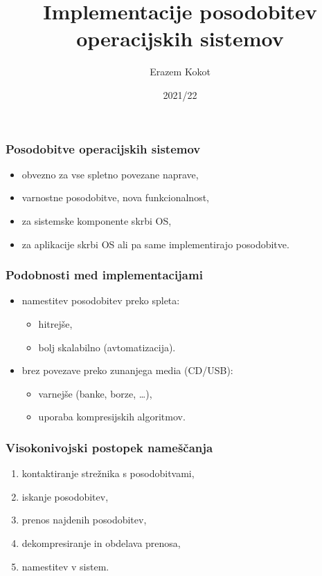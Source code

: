 \documentclass[aspectratio=169]{beamer}
\title{Implementacije posodobitev operacijskih sistemov}
\author{Erazem Kokot}
\institute[FRI]{Sistemska programska oprema,\\Fakulteta za računalništvo in informatiko}
\date{2021/22}
\begin{document}
    \begin{frame}
    \titlepage
    \end{frame}

    \begin{frame}
        \frametitle{Posodobitve operacijskih sistemov}
        \begin{itemize}
            \item obvezno za vse spletno povezane naprave,
            \item varnostne posodobitve, nova funkcionalnost,
            \item za sistemske komponente skrbi OS,
            \item za aplikacije skrbi OS ali pa same implementirajo posodobitve.
        \end{itemize}
    \end{frame}

    \begin{frame}
        \frametitle{Podobnosti med implementacijami}
        \begin{itemize}
            \item namestitev posodobitev preko spleta:
            \begin{itemize}
                \item hitrejše,
                \item bolj skalabilno (avtomatizacija).
            \end{itemize}
            \item brez povezave preko zunanjega media (CD/USB):
            \begin{itemize}
                \item varnejše (banke, borze, \ldots),
                \item uporaba kompresijskih algoritmov.
            \end{itemize}
        \end{itemize}
    \end{frame}

    \begin{frame}
        \frametitle{Visokonivojski postopek nameščanja}
        \begin{enumerate}
            \item kontaktiranje strežnika s posodobitvami,
            \item iskanje posodobitev,
            \item prenos najdenih posodobitev,
            \item dekompresiranje in obdelava prenosa,
            \item namestitev v sistem.
        \end{enumerate}
    \end{frame}
\end{document}
